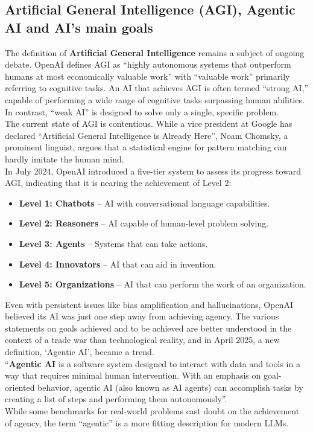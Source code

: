 \documentclass[12pt]{article}
\begin{document}
    \subsection{Artificial General Intelligence (AGI), Agentic AI and AI's main goals}
    The definition of \textbf{Artificial General Intelligence} remains a subject of ongoing debate. OpenAI defines AGI as ``highly autonomous systems that outperform humans at most economically valuable work''\cite{OpenAICharter} with ``valuable work'' primarily referring to cognitive tasks. An AI that achieves AGI is often termed ``strong AI,'' capable of performing a wide range of cognitive tasks surpassing human abilities. In contrast, ``weak AI'' is designed to solve only a single, specific problem.\\
The current state of AGI is contentious. While a vice president at Google has declared ``Artificial General Intelligence is Already Here'',\cite{AGIOpenAI} Noam Chomsky, a prominent linguist, argues that a statistical engine for pattern matching can hardly imitate the human mind.\cite{Chomsky}\\
In July 2024, OpenAI introduced a five-tier system to assess its progress toward AGI,\cite{bloomberg5tier}\cite{arstechnica5tier} indicating that it is nearing the achievement of Level 2:
\begin{itemize}
    \item \textbf{Level 1: Chatbots} – AI with conversational language capabilities.
    \item \textbf{Level 2: Reasoners} – AI capable of human-level problem solving.
    \item \textbf{Level 3: Agents} – Systems that can take actions.
    \item \textbf{Level 4: Innovators} – AI that can aid in invention.
    \item \textbf{Level 5: Organizations} – AI that can perform the work of an organization.
\end{itemize}
Even with persistent issues like bias amplification and hallucinations, OpenAI believed its AI was just one step away from achieving agency.
The various statements on goals achieved and to be achieved are better understood in the context of a trade war than technological reality, and in April 2025, a new definition, ‘Agentic AI’, became a trend.\cite{AgenticAITrend}\\
``\textbf{Agentic AI} is a software system designed to interact with data and tools in a way that requires minimal human intervention. With an emphasis on goal-oriented behavior, agentic AI (also known as AI agents) can accomplish tasks by creating a list of steps and performing them autonomously''.\cite{RedHatAgenticAI}\\
While some benchmarks for real-world problems cast doubt on the achievement of agency, the term ``agentic'' is a more fitting description for modern LLMs.
\end{document}
